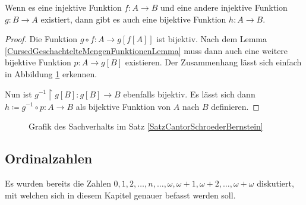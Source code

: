 \begin{satz}
	Wenn es eine injektive Funktion $f:A\to B$ und eine andere injektive Funktion $g : B\to A$ existiert, dann gibt es auch eine bijektive Funktion $h:A\to B$.
	\label{SatzCantorSchroederBernstein}
\end{satz}
\begin{proof}
	Die Funktion $g\circ f : A \to g[f[A]]$ ist bijektiv. Nach dem Lemma \ref{CursedGeschachtelteMengenFunktionenLemma} muss dann auch eine weitere bijektive Funktion $p: A \to g[B]$ existieren. Der Zusammenhang lässt sich einfach in Abbildung \ref{CantorSchroederBernsteinGrafik} erkennen. 
	
	Nun ist $g^{-1}\upharpoonright g[B] : g[B]\to B$ ebenfalls bijektiv. Es lässt sich dann $h\coloneqq g^{-1}\circ p : A\to B$ als bijektive Funktion von $A$ nach $B$ definieren. 
\end{proof}

\begin{figure}[h]
	\begin{center}
	\end{center}
	\caption{Grafik des Sachverhalts im Satz \ref{SatzCantorSchroederBernstein}}
	\label{CantorSchroederBernsteinGrafik}
\end{figure}


\subsection{Ordinalzahlen}

Es wurden bereits die Zahlen $0,1,2,\dots,n,\dots,\omega,\omega+1,\omega+2,\dots,\omega+\omega$ diskutiert, mit welchen sich in diesem Kapitel genauer befasst werden soll.

